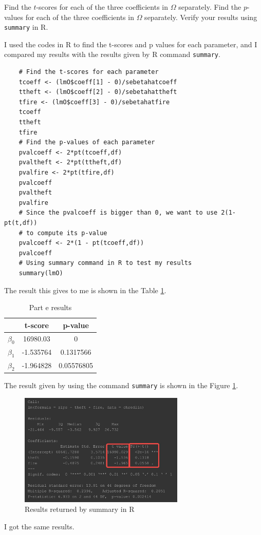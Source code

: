 \begin{question}
    Find the $t$-scores for each of the three coefficients in $\Omega$ separately. Find the $p$-values for each of the three coefficients in $\Omega$ separately. Verify your results using \verb+summary+ in R.
\end{question}

\begin{answer}
I used the codes in R to find the t-scores and p values for each parameter, and I compared my results with the results given by R command \verb+summary+.

\begin{verbatim}
    # Find the t-scores for each parameter
    tcoeff <- (lmO$coeff[1] - 0)/sebetahatcoeff
    ttheft <- (lmO$coeff[2] - 0)/sebetahattheft
    tfire <- (lmO$coeff[3] - 0)/sebetahatfire
    tcoeff
    ttheft
    tfire
    # Find the p-values of each parameter
    pvalcoeff <- 2*pt(tcoeff,df)
    pvaltheft <- 2*pt(ttheft,df)
    pvalfire <- 2*pt(tfire,df)
    pvalcoeff
    pvaltheft
    pvalfire
    # Since the pvalcoeff is bigger than 0, we want to use 2(1-pt(t,df)) 
    # to compute its p-value
    pvalcoeff <- 2*(1 - pt(tcoeff,df))
    pvalcoeff
    # Using summary command in R to test my results
    summary(lmO)
\end{verbatim}

The result this gives to me is shown in the Table \ref{tab:tab1}.

\begin{table}[H]
\centering
\caption{Part e results}
\label{tab:tab1}
\begin{tabular}{|c|c|c|}
\hline
\textbf{} & \textbf{t-score} & \textbf{p-value} \\ \hline
$\beta_0$     & 16980.03         & 0                \\ \hline
$\beta_1$     & -1.535764        & 0.1317566        \\ \hline
$\beta_2$     & -1.964828        & 0.05576805       \\ \hline
\end{tabular}
\end{table}

The result given by using the command \verb+summary+ is shown in the Figure \ref{fig:fig11}.
     \begin{figure}[H]
        \centering
        \includegraphics[width=0.7\textwidth]{Figure 11.png}
        \caption{\label{fig:fig11}Results returned by summary in R}
    \end{figure}

I got the same results.
\end{answer}


